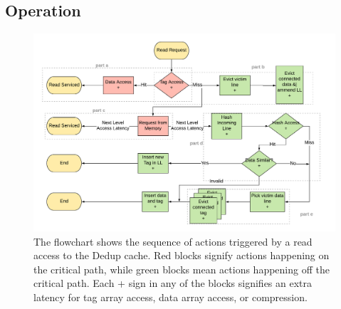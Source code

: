 \subsection{Operation}
\label{ssec:DedupOperations}
\begin{figure}[h]
    \includegraphics[width=\textwidth]{Dedup_Read.pdf}
    \caption[Dedup Read]{The flowchart shows the sequence of actions triggered by a read access to the Dedup cache. Red blocks signify actions happening on the critical path, while green blocks mean actions happening off the critical path. Each + sign in any of the blocks signifies an extra latency for tag array access, data array access, or compression.}
    \label{fig:Dedup_Read}
\end{figure}
